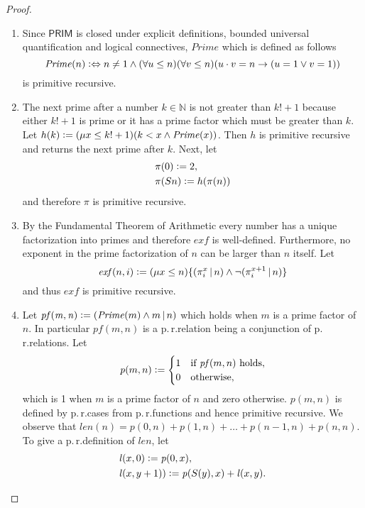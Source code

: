 \begin{proof}
\begin{enumerate}
\item Since $\mathsf{PRIM}$ is closed under explicit definitions, bounded universal quantification and logical connectives, $\mathit{Prime}$ which is defined as follows
\[ \mathit{Prime}(n) \vcentcolon \Leftrightarrow n \neq 1 \wedge (\forall u \le n ) (\forall v \le n ) (u \cdot v = n \rightarrow (u=1 \vee v=1))\]
is primitive recursive.
\item The next prime after a number $k \in \mathbb{N}$ is not greater than $k!+1$ because either $k!+1$ is prime or it has a prime factor which must be greater than $k$. Let $h(k) \vcentcolon= (\mu x \le k! +1) (k < x \wedge \mathit{Prime}(x))$. Then $h$ is primitive recursive and returns the next prime after $k$. Next, let
\begin{align*}
& \pi(0) \vcentcolon= 2, \\
& \pi(Sn) \vcentcolon= h(\pi(n))
\end{align*}
and therefore $\pi$ is primitive recursive.
\item By the Fundamental Theorem of Arithmetic every number has a unique factorization into primes and therefore $\mathit{exf}$ is well-defined. Furthermore, no exponent in the prime factorization of $n$ can be larger than $n$ itself. Let
\[ \mathit{exf}(n,i)  \vcentcolon= (\mu x \le n ) \lbrace ( \pi_i^x \,|\, n ) \wedge \lnot ( \pi_i^{x+1} \,|\, n) \rbrace \] and thus $\mathit{exf}$ is primitive recursive.
\item Let $\mathit{pf(m, n)} \vcentcolon= (\mathit{Prime}(m) \wedge m \,|\, n )$ which holds when $m$ is a prime factor of $n$. In particular $\mathit{pf}(m,n)$ is a p.\,r.\@ relation being a conjunction of p.\,r.\@ relations. Let \[\mathit{p}(m,n) \vcentcolon= \begin{cases} 1 & \text{if }\mathit{pf}(m,n) \text{ holds}, \\ 
0 & \text{otherwise,}\end{cases}\] which is 1 when $m$ is a prime factor of $n$ and zero otherwise. $\mathit{p}(m,n)$ is defined by p.\,r.\@ cases from p.\,r.\@ functions and hence primitive recursive. We observe that $ \mathit{len}(n) = \mathit{p}(0,n) + \mathit{p}(1,n) + \ldots + \mathit{p}(n-1, n) + \mathit{p}(n,n)$. To give a p.\,r.\@ definition of $\mathit{len}$, let 
\begin{align*}
&\mathit{l}(x,0) \vcentcolon= \mathit{p} (0, x), \\ 
&\mathit{l}(x, y + 1)) \vcentcolon= \mathit{p}(S(y),x) + \mathit{l}(x,y).
\end{align*}

\end{enumerate}
\end{proof}
